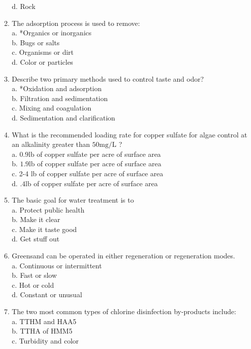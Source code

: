 \begin{enumerate}
d. Rock\\
\item The adsorption process is used to remove:\\
a. *Organics or inorganics\\
b. Bugs or salts\\
c. Organisms or dirt\\
d. Color or particles\\
\item Describe two primary methods used to control taste and odor?\\
a. *Oxidation and adsorption\\
b. Filtration and sedimentation\\
c. Mixing and coagulation\\
d. Sedimentation and clarification\\
\item What is the recommended loading rate for copper sulfate for algae control at an alkalinity greater than $50 \mathrm{mg} / \mathrm{L}$ ?\\
a. $0.9 \mathrm{lb}$ of copper sulfate per acre of surface area\\
b. $1.9 \mathrm{lb}$ of copper sulfate per acre of surface area\\
c. 2-4 lb of copper sulfate per acre of surface area\\
d. $.4 \mathrm{lb}$ of copper sulfate per acre of surface area\\
\item The basic goal for water treatment is to\\
a. Protect public health\\
b. Make it clear\\
c. Make it taste good\\
d. Get stuff out\\
\item Greensand can be operated in either regeneration or regeneration modes.\\
a. Continuous or intermittent\\
b. Fast or slow\\
c. Hot or cold\\
d. Constant or unusual\\
\item The two most common types of chlorine disinfection by-products include:\\
a. TTHM and HAA5\\
b. TTHA of HMM5\\
c. Turbidity and color\\

\end{enumerate}
